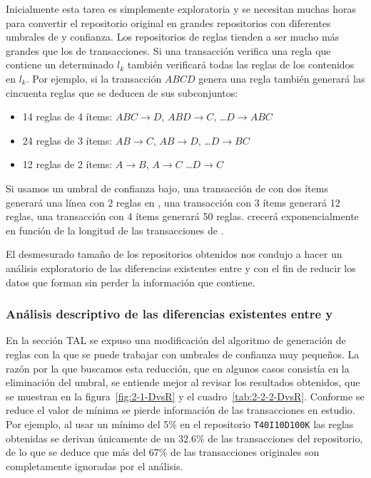 Inicialmente esta tarea es simplemente exploratoria y se necesitan muchas horas para convertir el repositorio original \D en grandes repositorios \R con diferentes umbrales de \soporte y confianza. Los repositorios de reglas tienden a ser mucho más grandes que los de transacciones. Si una transacción verifica una regla que contiene un determinado \kitemset $l_k$ también verificará todas las reglas de los \itemsets contenidos en $l_k$. Por ejemplo, si la transacción $ABCD$ genera una regla también generará las cincuenta reglas que se deducen de sus subconjuntos:
\begin{itemize}
  \item 14 reglas de 4 ítems: $ABC\rightarrow D$, $ABD\rightarrow C$, \ldots $D\rightarrow ABC$
  \item 24 reglas de 3 ítems: $AB\rightarrow C$, $AB\rightarrow D$, \ldots $D\rightarrow BC$
  \item 12 reglas de 2 ítems: $A\rightarrow B$, $A\rightarrow C$ \ldots $D\rightarrow C$
\end{itemize}

Si usamos un umbral de confianza bajo, una transacción de \D con dos ítems generará una línea con 2 reglas en \R, una transacción con 3 ítems generará 12 reglas, una transacción con 4 ítems generará 50 reglas. \R crecerá exponencialmente en función de la longitud de las transacciones de \D.

El desmesurado tamaño de los repositorios \R obtenidos nos condujo a hacer un análisis exploratorio de las diferencias existentes entre \R y \D con el fin de reducir los datos que forman \R sin perder la información que contiene.




\subsubsection{Análisis descriptivo de las diferencias existentes entre \D y \R}
En la sección TAL se expuso una modificación del algoritmo de generación de reglas con la que se puede trabajar con umbrales de confianza muy pequeños. La razón por la que buscamos esta reducción, que en algunos casos consistía en la eliminación del umbral, se entiende mejor al revisar los resultados obtenidos, que se muestran en la figura~\ref{fig:2-1-DvsR} y el cuadro~\ref{tab:2-2-2-DvsR}. Conforme se reduce el valor de \confianza mínima se pierde información de las transacciones en estudio. Por ejemplo, al usar un \soporte mínimo del 5\% en el repositorio \texttt{T40I10D100K} las reglas obtenidas se derivan únicamente de un 32.6\% de las transacciones del repositorio, de lo que se deduce que más del 67\% de las transacciones originales son completamente ignoradas por el análisis.

